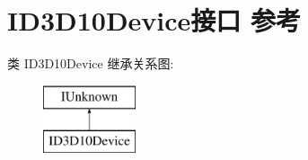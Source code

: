 \hypertarget{interface_i_d3_d10_device}{}\section{I\+D3\+D10\+Device接口 参考}
\label{interface_i_d3_d10_device}
类 I\+D3\+D10\+Device 继承关系图\+:\begin{figure}[H]
\begin{center}
\leavevmode
\includegraphics[height=2.000000cm]{interface_i_d3_d10_device}
\end{center}
\end{figure}
